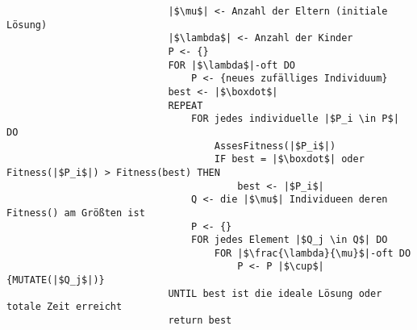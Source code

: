 \begin{itemize}
\begin{itemize}
\begin{itemize}
\begin{verbatim}
                            |$\mu$| <- Anzahl der Eltern (initiale Lösung)
                            |$\lambda$| <- Anzahl der Kinder
                            P <- {}
                            FOR |$\lambda$|-oft DO
                                P <- {neues zufälliges Individuum}
                            best <- |$\boxdot$|
                            REPEAT
                                FOR jedes individuelle |$P_i \in P$| DO
                                    AssesFitness(|$P_i$|)
                                    IF best = |$\boxdot$| oder Fitness(|$P_i$|) > Fitness(best) THEN
                                        best <- |$P_i$|
                                Q <- die |$\mu$| Individueen deren Fitness() am Größten ist
                                P <- {}
                                FOR jedes Element |$Q_j \in Q$| DO
                                    FOR |$\frac{\lambda}{\mu}$|-oft DO
                                        P <- P |$\cup$| {MUTATE(|$Q_j$|)}
                            UNTIL best ist die ideale Lösung oder totale Zeit erreicht
                            return best
                            \end{verbatim}
                    \end{itemize}
            \end{itemize}
    \end{itemize}

\pagebreak

